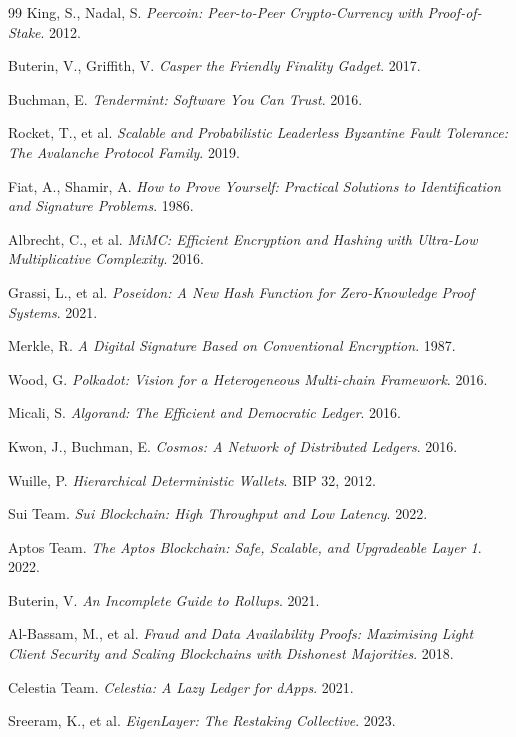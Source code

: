 \documentclass[11pt,a4paper]{article}
\begin{document}
\begin{thebibliography}{99}
King, S., Nadal, S. \textit{Peercoin: Peer-to-Peer Crypto-Currency with Proof-of-Stake}. 2012.

Buterin, V., Griffith, V. \textit{Casper the Friendly Finality Gadget}. 2017.

Buchman, E. \textit{Tendermint: Software You Can Trust}. 2016.

Rocket, T., et al. \textit{Scalable and Probabilistic Leaderless Byzantine Fault Tolerance: The Avalanche Protocol Family}. 2019.

Fiat, A., Shamir, A. \textit{How to Prove Yourself: Practical Solutions to Identification and Signature Problems}. 1986.

Albrecht, C., et al. \textit{MiMC: Efficient Encryption and Hashing with Ultra-Low Multiplicative Complexity}. 2016.

Grassi, L., et al. \textit{Poseidon: A New Hash Function for Zero-Knowledge Proof Systems}. 2021.

Merkle, R. \textit{A Digital Signature Based on Conventional Encryption}. 1987.

Wood, G. \textit{Polkadot: Vision for a Heterogeneous Multi-chain Framework}. 2016.

Micali, S. \textit{Algorand: The Efficient and Democratic Ledger}. 2016.

Kwon, J., Buchman, E. \textit{Cosmos: A Network of Distributed Ledgers}. 2016.

Wuille, P. \textit{Hierarchical Deterministic Wallets}. BIP 32, 2012.

Sui Team. \textit{Sui Blockchain: High Throughput and Low Latency}. 2022.

Aptos Team. \textit{The Aptos Blockchain: Safe, Scalable, and Upgradeable Layer 1}. 2022.

Buterin, V. \textit{An Incomplete Guide to Rollups}. 2021.

Al-Bassam, M., et al. \textit{Fraud and Data Availability Proofs: Maximising Light Client Security and Scaling Blockchains with Dishonest Majorities}. 2018.

Celestia Team. \textit{Celestia: A Lazy Ledger for dApps}. 2021.

Sreeram, K., et al. \textit{EigenLayer: The Restaking Collective}. 2023.


\end{thebibliography}
\end{document}
